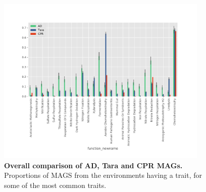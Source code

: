 \documentclass[10pt,letterpaper]{article}
\begin{document}
\begin{figure}
\includegraphics[width=0.9\textwidth]{mag_comparison_bars_cpr}
\caption{{\bf Overall comparison of AD, Tara and CPR MAGs.}
Proportions of MAGS from the environments having a trait, for some of the most common traits.}
\label{mag-compare}
\end{figure}



\nolinenumbers

%
%
% 

\clearpage

{}





\end{document}
